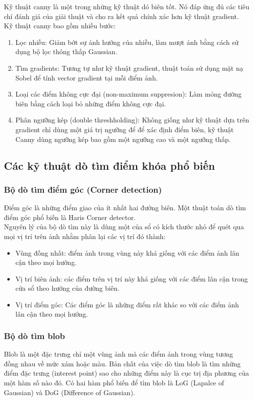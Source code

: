 Kỹ thuật canny là một trong những kỹ thuật dó biên tốt. Nó đáp ứng đủ các tiêu chí đánh giá của giải thuật và cho ra kết quả chính xác hơn kỹ thuật gradient. Kỹ thuật canny bao gồm nhiều bước:
\begin{enumerate}
	\item Lọc nhiễu: Giảm bớt sự ảnh hưởng của nhiễu, làm mượt ảnh bằng cách sử dụng bộ lọc thông thấp Gaussian.
	\item Tìm gradients: Tương tự như kỹ thuật gradient, thuật toán sử dụng mặt nạ Sobel để tính vector gradient tại mỗi điểm ảnh.
	\item Loại các điểm không cực đại (non-maximum suppresion): Làm mỏng đường biên bằng cách loại bỏ những điểm không cực đại.
	\item Phân ngưỡng kép (double threshholding): Không giống như kỹ thuật dựa trên gradient chỉ dùng một giá trị ngưỡng để để xác định điểm biên, kỹ thuật Canny dùng ngưỡng kép bao gồm một ngưỡng cao và một ngưỡng thấp.
\end{enumerate}
\subsection{Các kỹ thuật dò tìm điểm khóa phổ biến}
\subsubsection{Bộ dò tìm điểm góc (Corner detection)}
Điểm góc là những điểm giao của ít nhất hai đường biên. Một thuật toán dò tìm điểm góc phổ biến là Haris Corner detector.\\

Nguyên lý của bộ dò tìm này là dùng một của sổ có kích thước nhỏ để quét qua mọi vị trí trên ảnh nhằm phân lại các vị trí đó thành:
\begin{itemize}
	\item Vùng đồng nhất: điểm ảnh trong vùng này khá giống với các điểm ảnh lân cận theo mọi hướng.
	\item Vị trí biên ảnh: các điểm trên vị trí này khá giống với các điểm lân cận trong cửa sổ theo hướng của đường biên.
	\item Vị trí điểm góc: Các điểm góc là những điểm rất khác so với các điểm ảnh lân cận theo mọi hướng.
\end{itemize}
\subsubsection{Bộ dò tìm blob}
Blob là một đặc trưng chỉ một vùng ảnh mà các điểm ảnh trong vùng tương đồng nhau về mức xám hoặc màu. Bản chất của việc dò tìm blob là tìm những điểm đặc trưng (interest point) sao cho những điểm này là cục trị địa phương của một hàm số nào đó. Có hai hàm phổ biến để tìm blob là LoG (Lapalce of Gaussian) và DoG (Difference of Gaussian).

